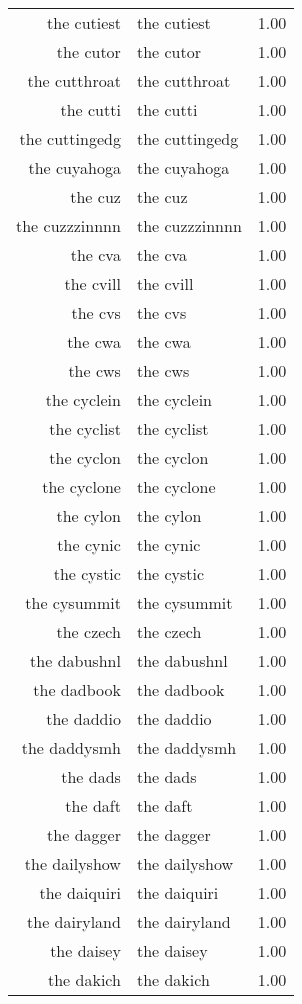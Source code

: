 \begin{table}[ht]
\begin{tabular}{rlr}
  the cutiest & the cutiest & 1.00 \\ 
  the cutor & the cutor & 1.00 \\ 
  the cutthroat & the cutthroat & 1.00 \\ 
  the cutti & the cutti & 1.00 \\ 
  the cuttingedg & the cuttingedg & 1.00 \\ 
  the cuyahoga & the cuyahoga & 1.00 \\ 
  the cuz & the cuz & 1.00 \\ 
  the cuzzzinnnn & the cuzzzinnnn & 1.00 \\ 
  the cva & the cva & 1.00 \\ 
  the cvill & the cvill & 1.00 \\ 
  the cvs & the cvs & 1.00 \\ 
  the cwa & the cwa & 1.00 \\ 
  the cws & the cws & 1.00 \\ 
  the cyclein & the cyclein & 1.00 \\ 
  the cyclist & the cyclist & 1.00 \\ 
  the cyclon & the cyclon & 1.00 \\ 
  the cyclone & the cyclone & 1.00 \\ 
  the cylon & the cylon & 1.00 \\ 
  the cynic & the cynic & 1.00 \\ 
  the cystic & the cystic & 1.00 \\ 
  the cysummit & the cysummit & 1.00 \\ 
  the czech & the czech & 1.00 \\ 
  the dabushnl & the dabushnl & 1.00 \\ 
  the dadbook & the dadbook & 1.00 \\ 
  the daddio & the daddio & 1.00 \\ 
  the daddysmh & the daddysmh & 1.00 \\ 
  the dads & the dads & 1.00 \\ 
  the daft & the daft & 1.00 \\ 
  the dagger & the dagger & 1.00 \\ 
  the dailyshow & the dailyshow & 1.00 \\ 
  the daiquiri & the daiquiri & 1.00 \\ 
  the dairyland & the dairyland & 1.00 \\ 
  the daisey & the daisey & 1.00 \\ 
  the dakich & the dakich & 1.00 \\ 

\end{tabular}
\end{table}
